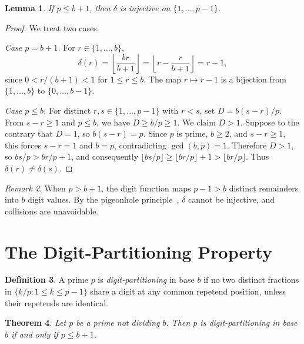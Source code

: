 \documentclass[12pt]{amsart}
\newtheorem{theorem}{Theorem}
\newtheorem{lemma}[theorem]{Lemma}
\theoremstyle{definition}
\newtheorem{definition}[theorem]{Definition}
\theoremstyle{remark}
\newtheorem{remark}[theorem]{Remark}
\begin{document}
\begin{lemma}\label{lem:injective}
If $p \le b + 1$, then $\delta$ is injective on $\{1, \ldots, p{-}1\}$.
\end{lemma}

\begin{proof}
We treat two cases.

\medskip\noindent
\emph{Case $p = b + 1$.}\quad
For $r \in \{1, \ldots, b\}$,
\[
\delta(r)
= \left\lfloor \frac{br}{b+1} \right\rfloor
= \left\lfloor r - \frac{r}{b+1} \right\rfloor
= r - 1,
\]
since $0 < r/(b{+}1) < 1$ for $1 \le r \le b$. The map
$r \mapsto r - 1$ is a bijection from $\{1, \ldots, b\}$ to
$\{0, \ldots, b{-}1\}$.

\medskip\noindent
\emph{Case $p \le b$.}\quad
For distinct $r, s \in \{1, \ldots, p{-}1\}$ with $r < s$, set
$D = b(s{-}r)/p$. From $s - r \ge 1$ and $p \le b$, we have
$D \ge b/p \ge 1$. We claim $D > 1$. Suppose to the contrary
that $D = 1$, so $b(s - r) = p$. Since $p$ is prime, $b \ge 2$,
and $s - r \ge 1$, this forces $s - r = 1$ and $b = p$,
contradicting $\gcd(b, p) = 1$. Therefore $D > 1$, so
$bs/p > br/p + 1$, and consequently
$\lfloor bs/p \rfloor \ge \lfloor br/p \rfloor + 1 > \lfloor br/p \rfloor$.
Thus $\delta(r) \ne \delta(s)$.
\end{proof}

\begin{remark}
When $p > b + 1$, the digit function maps $p - 1 > b$ distinct
remainders into $b$ digit values. By the pigeonhole
principle~\cite{stanley}, $\delta$ cannot be injective, and
collisions are unavoidable.
\end{remark}

\section{The Digit-Partitioning Property}

\begin{definition}
A prime $p$ is \emph{digit-partitioning} in base $b$ if no two
distinct fractions in $\{k/p : 1 \le k \le p{-}1\}$ share a digit
at any common repetend position, unless their repetends are
identical.
\end{definition}

\begin{theorem}\label{thm:characterization}
Let $p$ be a prime not dividing $b$. Then $p$ is digit-partitioning
in base $b$ if and only if $p \le b + 1$.
\end{theorem}
\end{document}

